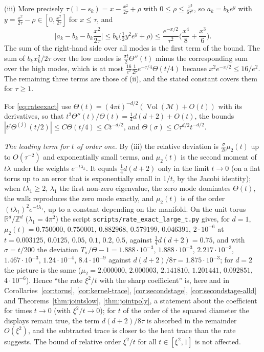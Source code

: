 \documentclass[11pt,a4paper]{article}
\makeatletter
\theoremstyle{stmt}
\theoremstyle{defn}
\theoremstyle{rmk}
\renewenvironment{proof}[1][\proofname]{\par\pushQED{\qed}\normalfont\topsep6\p@\@plus6\p@\relax
  \trivlist\item[\hskip\labelsep{\sffamily\itshape\small #1.}]\ignorespaces}{\popQED\endtrivlist\@endpefalse}
\numberwithin{equation}{section}
\DeclareMathOperator{\Vol}{Vol}
\newcommand{\M}{\mathcal{M}}
\newcommand{\R}{\mathbb{R}}
\makeatother
\begin{document}
{\begin{proof}
(iii) More precisely $\tau(1-s_k)=x-\tfrac{x^2}{2\tau}+\rho$ with $0\le\rho\le\tfrac{x^3}{6\tau^2}$, so $a_k=b_ke^{y}$ with $y=\tfrac{x^2}{2\tau}-\rho\in[0,\tfrac{x^2}{2\tau}]$ for $x\le\tau$, and
\[
\Big|a_k-b_k-b_k\frac{x^2}{2\tau}\Big|\le b_k\Big(\tfrac12y^2e^{y}+\rho\Big)\le\frac{e^{-x/2}}{\tau^2}\Big(\frac{x^4}{8}+\frac{x^3}{6}\Big).
\]
The sum of the right-hand side over all modes is the first term of the bound. The sum of $b_kx_k^2/2\tau$ over the low modes is $\frac{\sigma t}{2}\Theta''(t)$ minus the corresponding sum over the high modes, which is at most $\frac{16}{e^2}\frac1{2\tau}e^{-\tau/4}\Theta(t/4)$ because $x^2e^{-x/2}\le16/e^2$. The remaining three terms are those of (ii), and the stated constant covers them for $\tau\ge1$.

For \eqref{eq:rateexact} use $\Theta(t)=(4\pi t)^{-d/2}(\Vol(\M)+O(t))$ with its derivatives, so that $t^2\Theta''(t)/\Theta(t)=\tfrac14d(d+2)+O(t)$, the bounds $|t^j\Theta^{(j)}(t/2)|\le C\Theta(t/4)\le Ct^{-d/2}$, and $\Theta(\sigma)\le C\tau^{d/2}t^{-d/2}$.
\end{proof}

\smallskip\noindent\emph{The leading term for $t$ of order one.} By (iii) the relative deviation is $\frac{\sigma}{2t}\mu_2(t)$ up to $O(\tau^{-2})$ and exponentially small terms, and $\mu_2(t)$ is the second moment of $t\lambda$ under the weights $e^{-t\lambda_k}$. It equals $\frac14d(d+2)$ only in the limit $t\to0$ (on a flat torus up to an error that is exponentially small in $1/t$, by the Jacobi identity); when $t\lambda_1\ge2$, $\lambda_1$ the first non-zero eigenvalue, the zero mode dominates $\Theta(t)$, the walk reproduces the zero mode exactly, and $\mu_2(t)$ is of the order $(t\lambda_1)^2e^{-t\lambda_1}$, up to a constant depending on the manifold. On the unit torus $\R^d/\mathbb Z^d$ ($\lambda_1=4\pi^2$) the script \texttt{scripts/rate\_exact\_large\_t.py} gives, for $d=1$, $\mu_2(t)=0.750000$, $0.750001$, $0.882968$, $0.579199$, $0.046391$, $2\cdot10^{-6}$ at $t=0.003125$, $0.0125$, $0.05$, $0.1$, $0.2$, $0.5$, against $\frac14d(d+2)=0.75$, and with $\sigma=t/200$ the deviation $T_\sigma/\Theta-1=1.888\cdot10^{-3}$, $1.888\cdot10^{-3}$, $2.217\cdot10^{-3}$, $1.467\cdot10^{-3}$, $1.24\cdot10^{-4}$, $8.4\cdot10^{-9}$ against $d(d+2)/8\tau=1.875\cdot10^{-3}$; for $d=2$ the picture is the same ($\mu_2=2.000000$, $2.000003$, $2.141810$, $1.201441$, $0.092851$, $4\cdot10^{-6}$). Hence ``the rate $\xi^2/t$ with the sharp coefficient'' is, here and in Corollaries~\ref{cor:torus}, \ref{cor:kernel-trace}, \ref{cor:secondstage}, \ref{cor:secondstage-alld} and Theorems~\ref{thm:jointslow}, \ref{thm:jointpoly}, a statement about the coefficient for times $t\to0$ (with $\xi^2/t\to0$); for $t$ of the order of the squared diameter the displays remain true, the term $d(d+2)/8\tau$ is absorbed in the remainder $O(\xi^2)$, and the subtracted trace is closer to the heat trace than the rate suggests. The bound of relative order $\xi^2/t$ for all $t\in[\xi^2,1]$ is not affected.

}
\end{document}
